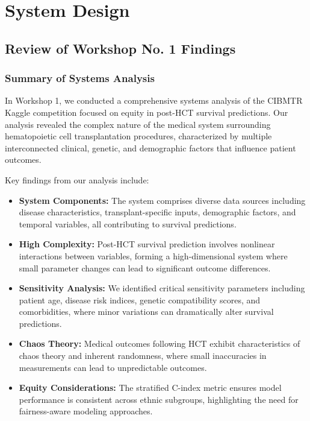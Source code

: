 \chapter{System Design}

\section{Review of Workshop No. 1 Findings}
\subsection{Summary of Systems Analysis}

In Workshop 1, we conducted a comprehensive systems analysis of the CIBMTR Kaggle competition focused on equity in post-HCT survival predictions. Our analysis revealed the complex nature of the medical system surrounding hematopoietic cell transplantation procedures, characterized by multiple interconnected clinical, genetic, and demographic factors that influence patient outcomes.

Key findings from our analysis include:

\begin{itemize}
    \item \textbf{System Components:} The system comprises diverse data sources including disease characteristics, transplant-specific inputs, demographic factors, and temporal variables, all contributing to survival predictions.
    
    \item \textbf{High Complexity:} Post-HCT survival prediction involves nonlinear interactions between variables, forming a high-dimensional system where small parameter changes can lead to significant outcome differences.
    
    \item \textbf{Sensitivity Analysis:} We identified critical sensitivity parameters including patient age, disease risk indices, genetic compatibility scores, and comorbidities, where minor variations can dramatically alter survival predictions.
    
    \item \textbf{Chaos Theory:} Medical outcomes following HCT exhibit characteristics of chaos theory and inherent randomness, where small inaccuracies in measurements can lead to unpredictable outcomes.
    
    \item \textbf{Equity Considerations:} The stratified C-index metric ensures model performance is consistent across ethnic subgroups, highlighting the need for fairness-aware modeling approaches.
\end{itemize}

